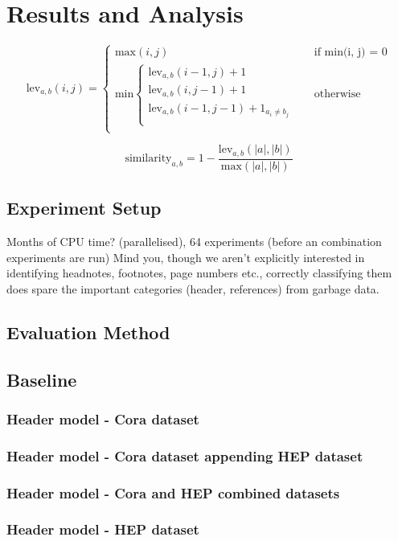 \documentclass[10pt, oneside]{scrartcl}   	%
\begin{document}
\section{Results and Analysis}
\[
  \text{lev}_{a, b}(i, j) = 
  \begin{cases} 
  	\text{max}(i, j) &\quad\text{if min(i, j) = 0} \\
	\text{min}
		\begin{cases}
			\text{lev}_{a, b}(i - 1, j) + 1 \\
			\text{lev}_{a, b}(i, j - 1) + 1 \\
			\text{lev}_{a, b}(i - 1, j - 1) + 1_{a_i \neq b_j} \\
		\end{cases} &\quad\text{otherwise} \\
  \end{cases}
\]

$$\text{similarity}_{a, b} =1 - \frac{\text{lev}_{a, b}(|a|, |b|)}{\text{max}(|a|, |b|)}$$

\subsection{Experiment Setup}
Months of CPU time? (parallelised), 64 experiments (before an combination experiments are run)
Mind you, though we aren't explicitly interested in identifying headnotes, footnotes, page numbers etc., correctly classifying them does spare the important categories (header, references) from garbage data.
\subsection{Evaluation Method}
\subsection{Baseline}
\subsubsection{Header model - Cora dataset}
\subsubsection{Header model - Cora dataset appending HEP dataset}
\subsubsection{Header model - Cora and HEP combined datasets}
\subsubsection{Header model - HEP dataset}
\end{document}
